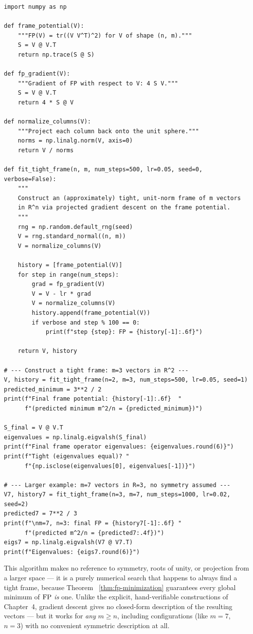 \begin{lstlisting}[caption={Constructing a tight frame from scratch via gradient descent on the frame potential}]
import numpy as np

def frame_potential(V):
    """FP(V) = tr((V V^T)^2) for V of shape (n, m)."""
    S = V @ V.T
    return np.trace(S @ S)

def fp_gradient(V):
    """Gradient of FP with respect to V: 4 S V."""
    S = V @ V.T
    return 4 * S @ V

def normalize_columns(V):
    """Project each column back onto the unit sphere."""
    norms = np.linalg.norm(V, axis=0)
    return V / norms

def fit_tight_frame(n, m, num_steps=500, lr=0.05, seed=0, verbose=False):
    """
    Construct an (approximately) tight, unit-norm frame of m vectors
    in R^n via projected gradient descent on the frame potential.
    """
    rng = np.random.default_rng(seed)
    V = rng.standard_normal((n, m))
    V = normalize_columns(V)

    history = [frame_potential(V)]
    for step in range(num_steps):
        grad = fp_gradient(V)
        V = V - lr * grad
        V = normalize_columns(V)
        history.append(frame_potential(V))
        if verbose and step % 100 == 0:
            print(f"step {step}: FP = {history[-1]:.6f}")

    return V, history

# --- Construct a tight frame: m=3 vectors in R^2 ---
V, history = fit_tight_frame(n=2, m=3, num_steps=500, lr=0.05, seed=1)
predicted_minimum = 3**2 / 2
print(f"Final frame potential: {history[-1]:.6f}  "
      f"(predicted minimum m^2/n = {predicted_minimum})")

S_final = V @ V.T
eigenvalues = np.linalg.eigvalsh(S_final)
print(f"Final frame operator eigenvalues: {eigenvalues.round(6)}")
print(f"Tight (eigenvalues equal)? "
      f"{np.isclose(eigenvalues[0], eigenvalues[-1])}")

# --- Larger example: m=7 vectors in R=3, no symmetry assumed ---
V7, history7 = fit_tight_frame(n=3, m=7, num_steps=1000, lr=0.02, seed=2)
predicted7 = 7**2 / 3
print(f"\nm=7, n=3: final FP = {history7[-1]:.6f} "
      f"(predicted m^2/n = {predicted7:.4f})")
eigs7 = np.linalg.eigvalsh(V7 @ V7.T)
print(f"Eigenvalues: {eigs7.round(6)}")
\end{lstlisting}

\begin{remark*}
This algorithm makes no reference to symmetry, roots of unity, or
projection from a larger space --- it is a purely numerical search that
happens to always find a tight frame, because Theorem~
\ref{thm:fp-minimization} guarantees every global minimum of $\operatorname{FP}$
\emph{is} one. Unlike the explicit, hand-verifiable constructions of
Chapter~4, gradient descent gives no closed-form description of the
resulting vectors --- but it works for \emph{any} $m\ge n$, including
configurations (like $m=7$, $n=3$) with no convenient symmetric
description at all.
\end{remark*}

